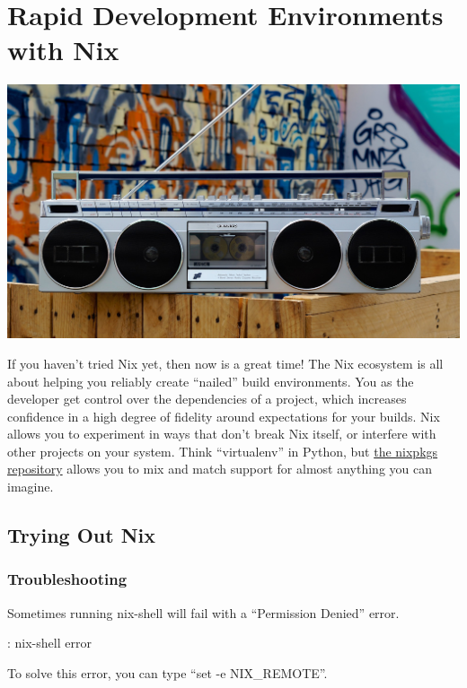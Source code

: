 \chapter{Rapid Development Environments with Nix}

\includegraphics[scale=0.85]{images/boombox-5693150_1920.jpg}

If you haven't tried Nix yet, then now is a great time! The Nix ecosystem is all about
helping you reliably create ``nailed'' build environments. You as the developer get control over
the dependencies of a project, which increases  confidence in a high degree of fidelity around
expectations for your builds. Nix allows you to experiment in ways that don't break Nix itself,
or interfere with other projects on your system. Think ``virtualenv'' in Python, 
but \href{https://github.com/NixOS/nixpkgs/tree/master/pkgs}{the nixpkgs repository}
allows you to mix and match support for almost anything you can imagine.

\section{Trying Out Nix}

\subsection{Troubleshooting}

\justify{}
Sometimes running nix-shell will fail with a ``Permission Denied'' error.

\begin{mybox}{\thetcbcounter: nix-shell error}
	
	\label{nixerr}
\end{mybox}

\justify{} 
To solve this error, you can type ``set -e NIX\_REMOTE''.


